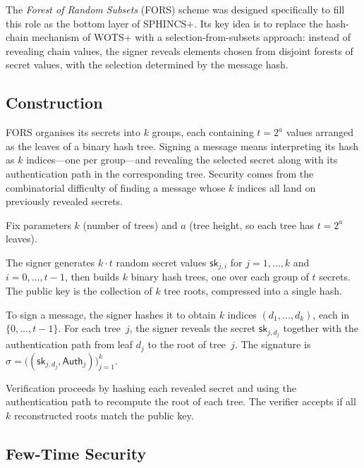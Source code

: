 The \emph{Forest of Random Subsets} (FORS) scheme was designed specifically to fill this role as the bottom layer of SPHINCS+.  Its key idea is to replace the hash-chain mechanism of WOTS+ with a selection-from-subsets approach: instead of revealing chain values, the signer reveals elements chosen from disjoint forests of secret values, with the selection determined by the message hash.

\subsection{Construction}
\label{subsec:fors-construction}

FORS organises its secrets into $k$ groups, each containing $t = 2^a$ values arranged as the leaves of a binary hash tree.  Signing a message means interpreting its hash as $k$ indices---one per group---and revealing the selected secret along with its authentication path in the corresponding tree.  Security comes from the combinatorial difficulty of finding a message whose $k$ indices all land on previously revealed secrets.

\begin{definition}
\label{def:fors}
Fix parameters $k$ (number of trees) and $a$ (tree height, so each tree has $t = 2^a$ leaves).

The signer generates $k \cdot t$ random secret values $\mathsf{sk}_{j,i}$ for $j = 1,\ldots,k$ and $i = 0,\ldots,t-1$, then builds $k$ binary hash trees, one over each group of $t$ secrets.  The public key is the collection of $k$ tree roots, compressed into a single hash.

To sign a message, the signer hashes it to obtain $k$ indices $(d_1,\ldots,d_k)$, each in $\{0,\ldots,t-1\}$.  For each tree~$j$, the signer reveals the secret $\mathsf{sk}_{j,d_j}$ together with the authentication path from leaf $d_j$ to the root of tree~$j$.  The signature is $\sigma = \bigl((\mathsf{sk}_{j,d_j}, \mathsf{Auth}_j)\bigr)_{j=1}^k$.

Verification proceeds by hashing each revealed secret and using the authentication path to recompute the root of each tree.  The verifier accepts if all $k$ reconstructed roots match the public key.
\end{definition}

\subsection{Few-Time Security}
\label{subsec:fors-security}

